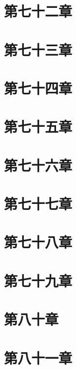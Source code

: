 \documentclass[UTF8]{ctexart}
\begin{document}
	\section{第七十二章}
	\section{第七十三章}
	\section{第七十四章}
	\section{第七十五章}
	\section{第七十六章}
	\section{第七十七章}
	\section{第七十八章}
	\section{第七十九章}
	\section{第八十章}
	\section{第八十一章}
	
\end{document}
